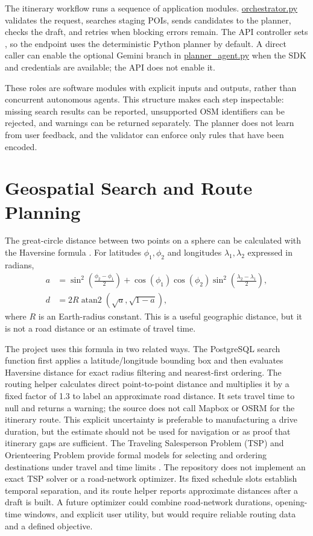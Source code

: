 The itinerary workflow runs a sequence of application modules. \url{orchestrator.py} validates the request, searches staging POIs, sends candidates to the planner, checks the draft, and retries when blocking errors remain. The API controller sets , so the endpoint uses the deterministic Python planner by default. A direct caller can enable the optional Gemini branch in \url{planner_agent.py} when the SDK and credentials are available; the API does not enable it.

These roles are software modules with explicit inputs and outputs, rather than concurrent autonomous agents. This structure makes each step inspectable: missing search results can be reported, unsupported OSM identifiers can be rejected, and warnings can be returned separately. The planner does not learn from user feedback, and the validator can enforce only rules that have been encoded.

\section{Geospatial Search and Route Planning}

The great-circle distance between two points on a sphere can be calculated with the Haversine formula \cite{sinnott1984virtues}. For latitudes $\phi_1,\phi_2$ and longitudes $\lambda_1,\lambda_2$ expressed in radians,
\begin{align}
    a &= \sin^2\left(\frac{\phi_2-\phi_1}{2}\right)
       + \cos(\phi_1)\cos(\phi_2)
         \sin^2\left(\frac{\lambda_2-\lambda_1}{2}\right),\\
    d &= 2R\operatorname{atan2}\left(\sqrt{a},\sqrt{1-a}\right),
\end{align}
where $R$ is an Earth-radius constant. This is a useful geographic distance, but it is not a road distance or an estimate of travel time.

The project uses this formula in two related ways. The PostgreSQL search function first applies a latitude/longitude bounding box and then evaluates Haversine distance for exact radius filtering and nearest-first ordering. The routing helper calculates direct point-to-point distance and multiplies it by a fixed factor of 1.3 to label an approximate road distance. It sets travel time to null and returns a warning; the source does not call Mapbox or OSRM for the itinerary route. This explicit uncertainty is preferable to manufacturing a drive duration, but the estimate should not be used for navigation or as proof that itinerary gaps are sufficient.
The Traveling Salesperson Problem (TSP) and Orienteering Problem provide formal models for selecting and ordering destinations under travel and time limits \cite{applegate2006traveling,vansteenwegen2011orienteering}. The repository does not implement an exact TSP solver or a road-network optimizer. Its fixed schedule slots establish temporal separation, and its route helper reports approximate distances after a draft is built. A future optimizer could combine road-network durations, opening-time windows, and explicit user utility, but would require reliable routing data and a defined objective.

